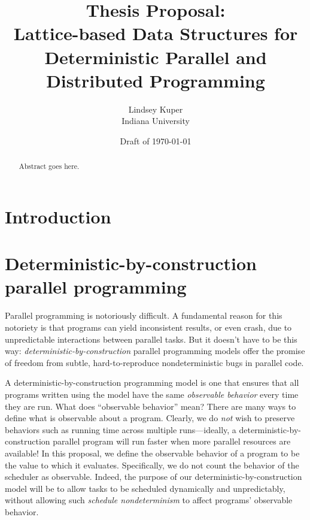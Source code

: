\documentclass{article}
\begin{document}
\title{Thesis Proposal: \\
  Lattice-based Data Structures for \\
  Deterministic Parallel and Distributed Programming}

\author{Lindsey Kuper \\ Indiana University}

\date{Draft of \today}

\maketitle

\begin{abstract}
  Abstract goes here.
\end{abstract}

\section{Introduction}

\section{Deterministic-by-construction parallel programming}

Parallel programming is notoriously difficult.  
A fundamental reason for this notoriety is that programs can yield
inconsistent results, or even crash, due to unpredictable interactions
between parallel tasks.  But it doesn't have to be this way:
\emph{deterministic-by-construction} parallel programming models offer
the promise of freedom from subtle, hard-to-reproduce nondeterministic
bugs in parallel code.

A deterministic-by-construction programming model is one that ensures
that all programs written using the model have the same
\emph{observable behavior} every time they are run.  What does
``observable behavior'' mean?  There are many ways to define what is
observable about a program.  Clearly, we do \emph{not} wish to
preserve behaviors such as running time across multiple
runs---ideally, a deterministic-by-construction parallel program will
run faster when more parallel resources are available!  In this
proposal, we define the observable behavior of a program to be the
value to which it evaluates.  Specifically, we do not count the
behavior of the scheduler as observable.  Indeed, the purpose of our
deterministic-by-construction model will be to allow tasks to be
scheduled dynamically and unpredictably, without allowing such
\emph{schedule nondeterminism} to affect programs' observable
behavior.
\end{document}
